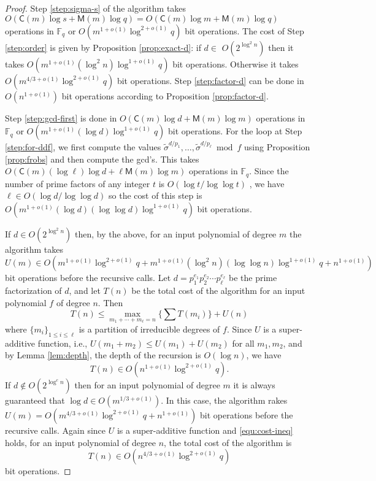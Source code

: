 \documentclass{article}
\theoremstyle{plain}
\theoremstyle{definition}
\def\F{\ensuremath{\mathbb{F}}}
\def\MM{\ensuremath{\mathsf{M}}}
\def\CC{\ensuremath{\mathsf{C}}}
\begin{document}
\begin{proof}
	Step \ref{step:sigma-s} of the algorithm takes $O(\CC(m)\log s + \MM(m)\log q) = O(\CC(m)\log m 
	+ \MM(m)\log q)$ operations in $\F_q$ or $O(m^{1 + o(1)}\log^{2 + o(1)}q)$ bit operations. The 
	cost of Step \ref{step:order} is given by Proposition \ref{prop:exact-d}: if $d \in $ 
	$O(2^{\log^2n})$ then it takes $O(m^{1 + o(1)} (\log^2n) \log^{1 + o(1)}q)$ bit operations. 
	Otherwise it takes $O(m^{4 / 3 + o(1)} \log^{2 + o(1)}q)$ bit operations. Step 
	\ref{step:factor-d} can be done in $O(n^{1 + o(1)})$ bit operations according to Proposition 
	\ref{prop:factor-d}. 
	
	Step \ref{step:gcd-first} is done in $O(\CC(m)\log d + \MM(m)\log m)$ operations in $\F_q$ 
	or $O(m^{1 + o(1)}(\log d)\log^{1 + o(1)}q)$ bit operations. For the loop at Step 
	\ref{step:for-ddf}, we first compute the values $\tilde{\sigma}^{d / p_1}, \dots, 
	\tilde{\sigma}^{d / p_\ell} \bmod f$ using Proposition \ref{prop:frobs} and then compute the 
	gcd's. This takes $O(\CC(m)(\log \ell)\log d + \ell\MM(m)\log m)$ operations in $\F_q$. Since 
	the number of prime factors of any integer $t$ is $O(\log t / \log\log t)$ 
	\cite{hardy1979introduction}, we have $\ell \in O(\log d / \log\log d)$ so the cost of this 
	step is $O(m^{1 + o(1)}(\log d)(\log \log d)\log^{1 + o(1)}q)$ bit operations.
	
	If $d \in O(2^{\log^2n})$ then, by the above, for an input polynomial of degree $m$ the 
	algorithm takes 
	\[ U(m) \in O(m^{1 + o(1)}\log^{2 + o(1)}q + m^{1 + o(1)}(\log^2n)(\log \log n)\log^{1 + o(1)}q 
	+ n^{1 + o(1)})
	\]
	bit operations before the recursive calls. Let $d = p_1^{e_1} p_2^{e_2} \cdots p_\ell^{e_\ell}$ 
	be the prime factorization of $d$, and let $T(n)$ be the total cost of the algorithm for an 
	input polynomial $f$ of degree $n$. Then
	\begin{equation}
	\label{equ:cost-ineq}
		T(n) \le \max_{m_1 + \cdots + m_\ell = n} \{ \sum T(m_i) \} + U(n)
	\end{equation}
	where $\{ m_i \}_{1 \le i \le \ell}$ is a partition of irreducible degrees of $f$. Since $U$ is 
	a super-additive function, i.e., $U(m_1 + m_2) \le U(m_1) + U(m_2)$ for all $m_1, m_2$, and by 
	Lemma \ref{lem:depth}, the depth of the recursion is $O(\log n)$, we have
	\[ T(n) \in O(n^{1 + o(1)} \log^{2 + o(1)}q). \]
	If $d \notin O(2^{\log^cn})$ then for an input polynomial of degree $m$ it is always guaranteed 
	that $\log d \in O(m^{1 / 3 + o(1)})$. In this case, the algorithm rakes $U(m) = O(m^{4 / 3 + 
	o(1)} \log^{2 + o(1)}q  + n^{1 + o(1)})$ bit operations before the recursive calls. Again since 
	$U$ is a super-additive function and \eqref{equ:cost-ineq} holds, for an input polynomial of 
	degree $n$, the total cost of the algorithm is
	\[ T(n) \in O(n^{4 / 3 + o(1)} \log^{2 + o(1)}q) \]
	bit operations.
\end{proof}
\end{document}
